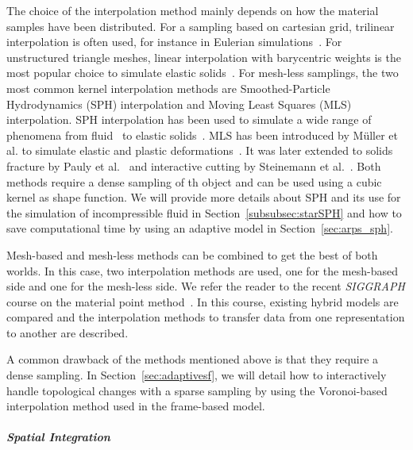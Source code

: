 The choice of the interpolation method mainly depends on how the material samples have been distributed. 
For a sampling based on cartesian grid, trilinear interpolation is often used, for instance in Eulerian simulations~\cite{Bridson2008}. 
For unstructured triangle meshes, linear interpolation with barycentric weights is the most popular choice to simulate elastic solids~\cite{Muller2008}.
For mesh-less samplings, the two most common kernel interpolation methods are Smoothed-Particle Hydrodynamics (SPH) interpolation and Moving Least Squares (MLS) interpolation.
SPH interpolation has been used to simulate a wide range of phenomena from fluid~\cite{Desbrun1999} to elastic solids~\cite{Becker2009}.
MLS has been introduced by M\"{u}ller et al. to simulate elastic and plastic deformations~\cite{Muller2004:melting}.
It was later extended to solids fracture by Pauly et al.~\cite{Pauly2005} and interactive cutting by Steinemann et al.~\cite{Steinemann2009}.
Both methods require a dense sampling of th object and can be used using a cubic kernel as shape function. We will provide more details about SPH and its use for the simulation of incompressible fluid in Section~\ref{subsubsec:starSPH} and how to save computational time by using an adaptive model in Section~\ref{sec:arps_sph}.

Mesh-based and mesh-less methods can be combined to get the best of both worlds.
In this case, two interpolation methods are used, one for the mesh-based side and one for the mesh-less side.
We refer the reader to the recent \emph{SIGGRAPH} course on the material point method~\cite{Jiang2016}.
In this course, existing hybrid models are compared and the interpolation methods to transfer data from one representation  to another are described.

A common drawback of the methods mentioned above is that they require a dense sampling. In Section~\ref{sec:adaptivesf}, we will detail how to interactively handle topological changes with a sparse sampling by using the Voronoi-based interpolation method used in the frame-based model.

\subparagraph{Spatial Integration}

